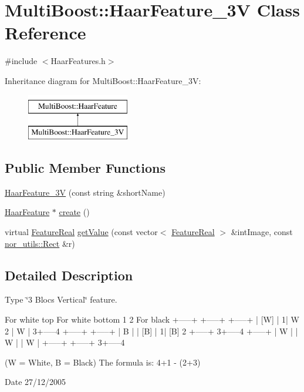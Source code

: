 \hypertarget{classMultiBoost_1_1HaarFeature__3V}{
\section{MultiBoost::HaarFeature\_\-3V Class Reference}
\label{classMultiBoost_1_1HaarFeature__3V}
}


{\ttfamily \#include $<$HaarFeatures.h$>$}

Inheritance diagram for MultiBoost::HaarFeature\_\-3V:\begin{figure}[H]
\begin{center}
\leavevmode
\includegraphics[height=2.000000cm]{classMultiBoost_1_1HaarFeature__3V}
\end{center}
\end{figure}
\subsection*{Public Member Functions}
\begin{DoxyCompactItemize}
\item 
\hyperlink{classMultiBoost_1_1HaarFeature__3V_a087249d8d218571d08379809ae67765a}{HaarFeature\_\-3V} (const string \&shortName)
\item 
\hyperlink{classMultiBoost_1_1HaarFeature}{HaarFeature} $\ast$ \hyperlink{classMultiBoost_1_1HaarFeature__3V_a78b0d02fbc910fef43e1151b9207ea00}{create} ()
\item 
virtual \hyperlink{Defaults_8h_a3a11cfe6a5d469d921716ca6291e934f}{FeatureReal} \hyperlink{classMultiBoost_1_1HaarFeature__3V_a43ac44c9246d6bfd757cea00d080ab42}{getValue} (const vector$<$ \hyperlink{Defaults_8h_a3a11cfe6a5d469d921716ca6291e934f}{FeatureReal} $>$ \&intImage, const \hyperlink{structnor__utils_1_1Rect}{nor\_\-utils::Rect} \&r)
\end{DoxyCompactItemize}


\subsection{Detailed Description}
Type \char`\"{}3 Blocs Vertical\char`\"{} feature. \begin{DoxyVerb}
	 For white top               For white bottom
	 1      2       For black 
	 +-----+        +-----+        +-----+
	 | [W] |       1|  W  2        |  W  |
	 3+-----4        +-----+        +-----+
	 |  B  |        | [B] |       1| [B] 2
	 +-----+       3+-----4        +-----+
	 |  W  |        |  W  |        |  W  |
	 +-----+        +-----+       3+-----4
	 \end{DoxyVerb}
 (W = White, B = Black) The formula is: 4+1 -\/ (2+3) \begin{DoxyDate}{Date}
27/12/2005 
\end{DoxyDate}



